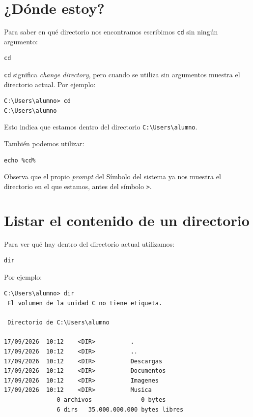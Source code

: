 \documentclass[11pt,a4paper]{article}
\begin{document}
\section{¿Dónde estoy?}

Para saber en qué directorio nos encontramos escribimos \texttt{cd}
sin ningún argumento:

\begin{lstlisting}
cd
\end{lstlisting}

\noindent \texttt{cd} significa \textit{change directory}, pero cuando
se utiliza sin argumentos muestra el directorio actual. Por ejemplo:

\begin{lstlisting}
C:\Users\alumno> cd
C:\Users\alumno
\end{lstlisting}

\noindent Esto indica que estamos dentro del directorio
\texttt{C:\textbackslash Users\textbackslash alumno}.

\noindent También podemos utilizar:

\begin{lstlisting}
echo %cd%
\end{lstlisting}

\begin{importante}
Observa que el propio \textit{prompt} del Símbolo del sistema ya nos
muestra el directorio en el que estamos, antes del símbolo
\texttt{>}.
\end{importante}

\section{Listar el contenido de un directorio}

Para ver qué hay dentro del directorio actual utilizamos:

\begin{lstlisting}
dir
\end{lstlisting}

\noindent Por ejemplo:

\begin{lstlisting}
C:\Users\alumno> dir
 El volumen de la unidad C no tiene etiqueta.

 Directorio de C:\Users\alumno

17/09/2026  10:12    <DIR>          .
17/09/2026  10:12    <DIR>          ..
17/09/2026  10:12    <DIR>          Descargas
17/09/2026  10:12    <DIR>          Documentos
17/09/2026  10:12    <DIR>          Imagenes
17/09/2026  10:12    <DIR>          Musica
               0 archivos              0 bytes
               6 dirs   35.000.000.000 bytes libres
\end{lstlisting}
\end{document}
